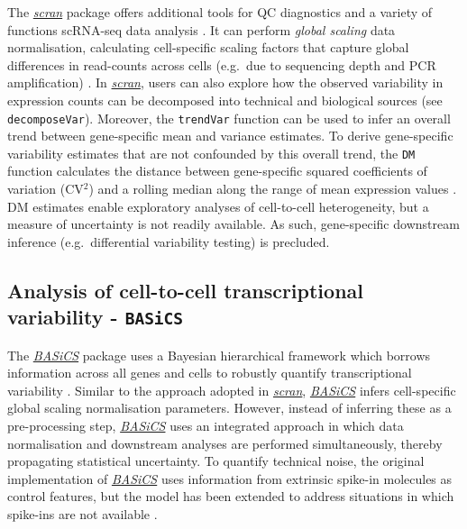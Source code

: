 \documentclass[9pt,a4paper,]{extarticle}
\begin{document}
The \emph{\href{https://bioconductor.org/packages/3.11/scran}{scran}} package offers additional tools for QC
diagnostics and a variety of functions scRNA-seq data analysis \citep{Lun2016}.
It can perform \emph{global scaling} data normalisation, calculating cell-specific scaling factors that capture global differences in read-counts across cells (e.g.~due to sequencing depth and PCR amplification) \citep{Lun2016pooling}.
In \emph{\href{https://bioconductor.org/packages/3.11/scran}{scran}}, users can also explore how the observed variability in
expression counts can be decomposed into technical and biological
sources (see \texttt{decomposeVar}).
Moreover, the \texttt{trendVar} function can be used to infer an overall trend between
gene-specific mean and variance estimates.
To derive gene-specific variability estimates that are not confounded by this
overall trend, the \texttt{DM} function calculates the distance between gene-specific
squared coefficients of variation (CV\(^2\)) and a rolling median along the range
of mean expression values \citep{Kolodziejczyk2015cell}.
DM estimates enable exploratory analyses of cell-to-cell heterogeneity, but a measure of uncertainty is not readily available. As such, gene-specific
downstream inference (e.g.~differential variability testing) is precluded.

\hypertarget{analysis-of-cell-to-cell-transcriptional-variability---basics}{%
\subsection{\texorpdfstring{Analysis of cell-to-cell transcriptional variability - \texttt{BASiCS}}{Analysis of cell-to-cell transcriptional variability - BASiCS}}\label{analysis-of-cell-to-cell-transcriptional-variability---basics}}

The \emph{\href{https://bioconductor.org/packages/3.11/BASiCS}{BASiCS}} package uses a Bayesian hierarchical framework
which borrows information across all genes and cells to robustly quantify
transcriptional variability \citep{Vallejos2015BASiCS}.
Similar to the approach adopted in \emph{\href{https://bioconductor.org/packages/3.11/scran}{scran}}, \emph{\href{https://bioconductor.org/packages/3.11/BASiCS}{BASiCS}}
infers cell-specific global scaling normalisation parameters.
However, instead of inferring these as a pre-processing step,
\emph{\href{https://bioconductor.org/packages/3.11/BASiCS}{BASiCS}} uses an integrated approach in which data normalisation
and downstream analyses are performed simultaneously, thereby propagating
statistical uncertainty.
To quantify technical noise, the original implementation of
\emph{\href{https://bioconductor.org/packages/3.11/BASiCS}{BASiCS}} uses information from extrinsic spike-in molecules as
control features, but the model has been extended to address situations in which
spike-ins are not available \citep{Eling2018}.
\end{document}
